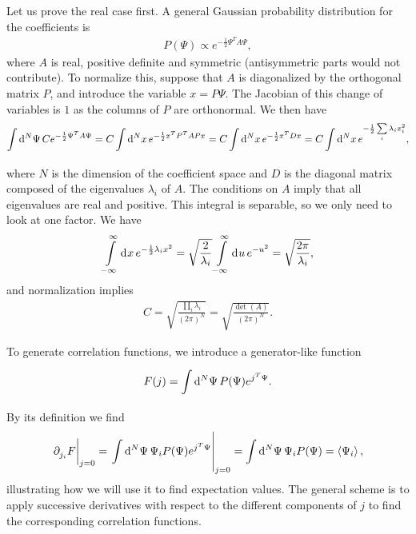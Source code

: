 Let us prove the real case first. A general Gaussian probability distribution for the coefficients is
\begin{align*}
	P(\Psi) \propto e^{-\frac{1}{2}\Psi^{T}A\Psi},
\end{align*}
where $A$ is real, positive definite and symmetric (antisymmetric parts would not contribute). To normalize this, suppose that $A$ is diagonalized by the orthogonal matrix $P$, and introduce the variable $x = P\Psi$. The Jacobian of this change of variables is $1$ as the columns of $P$ are orthonormal. We then have
\begin{align*}
	\int\limits_{}^{}\dd[N]{\Psi}Ce^{-\frac{1}{2}\Psi^{T}A\Psi} = C\int\limits_{}^{}\dd[N]{x}e^{-\frac{1}{2}x^{T}P^{T}APx} = C\int\limits_{}^{}\dd[N]{x}e^{-\frac{1}{2}x^{T}Dx} = C\int\limits_{}^{}\dd[N]{x}e^{-\frac{1}{2}\sum\limits_{i}\lambda_{i}x_{i}^{2}},
\end{align*}
where $N$ is the dimension of the coefficient space and $D$ is the diagonal matrix composed of the eigenvalues $\lambda_{i}$ of $A$. The conditions on $A$ imply that all eigenvalues are real and positive. This integral is separable, so we only need to look at one factor. We have
\begin{align*}
	\int\limits_{-\infty}^{\infty}\dd[]{x}e^{-\frac{1}{2}\lambda_{i}x^{2}} = \sqrt{\frac{2}{\lambda_{i}}}\int\limits_{-\infty}^{\infty}\dd[]{u}e^{-u^{2}} = \sqrt{\frac{2\pi}{\lambda_{i}}},
\end{align*}
and normalization implies
\begin{align*}
	C = \sqrt{\frac{\prod\limits_{i}\lambda_{i}}{(2\pi)^{N}}} = \sqrt{\frac{\det(A)}{(2\pi)^{N}}}.
\end{align*}

To generate correlation functions, we introduce a generator-like function
\begin{align*}
	F(j) = \int\limits_{}^{}\dd[N]{\Psi}P(\Psi)e^{j^{T}\Psi}.
\end{align*}
By its definition we find
\begin{align*}
	\eval{\del{}{j_{i}}F}_{j = 0} = \eval{\integ[N]{}{}{\Psi}{\Psi_{i}P(\Psi)e^{j^{T}\Psi}}}_{j = 0} = \integ[N]{}{}{\Psi}{\Psi_{i}P(\Psi)} = \expval{\Psi_{i}},
\end{align*}
illustrating how we will use it to find expectation values. The general scheme is to apply successive derivatives with respect to the different components of $j$ to find the corresponding correlation functions.

